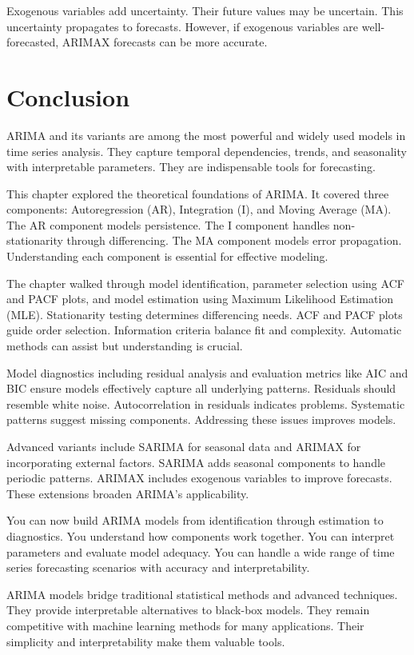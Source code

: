 Exogenous variables add uncertainty. Their future values may be uncertain. This uncertainty propagates to forecasts. However, if exogenous variables are well-forecasted, ARIMAX forecasts can be more accurate.



\section{Conclusion}

ARIMA and its variants are among the most powerful and widely used models in time series analysis. They capture temporal dependencies, trends, and seasonality with interpretable parameters. They are indispensable tools for forecasting.

This chapter explored the theoretical foundations of ARIMA. It covered three components: Autoregression (AR), Integration (I), and Moving Average (MA). The AR component models persistence. The I component handles non-stationarity through differencing. The MA component models error propagation. Understanding each component is essential for effective modeling.

The chapter walked through model identification, parameter selection using ACF and PACF plots, and model estimation using Maximum Likelihood Estimation (MLE). Stationarity testing determines differencing needs. ACF and PACF plots guide order selection. Information criteria balance fit and complexity. Automatic methods can assist but understanding is crucial.

Model diagnostics including residual analysis and evaluation metrics like AIC and BIC ensure models effectively capture all underlying patterns. Residuals should resemble white noise. Autocorrelation in residuals indicates problems. Systematic patterns suggest missing components. Addressing these issues improves models.

Advanced variants include SARIMA for seasonal data and ARIMAX for incorporating external factors. SARIMA adds seasonal components to handle periodic patterns. ARIMAX includes exogenous variables to improve forecasts. These extensions broaden ARIMA's applicability.

You can now build ARIMA models from identification through estimation to diagnostics. You understand how components work together. You can interpret parameters and evaluate model adequacy. You can handle a wide range of time series forecasting scenarios with accuracy and interpretability.

ARIMA models bridge traditional statistical methods and advanced techniques. They provide interpretable alternatives to black-box models. They remain competitive with machine learning methods for many applications. Their simplicity and interpretability make them valuable tools.


